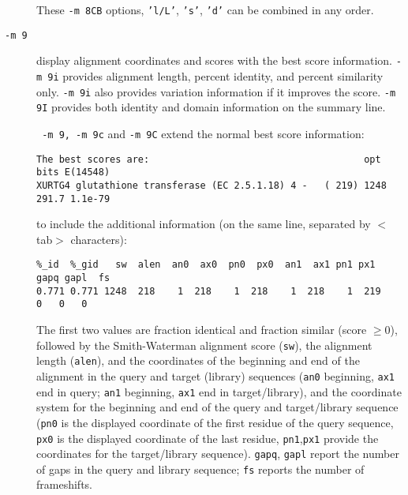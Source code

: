 \documentclass[11pt]{article}
\begin{document}
\begin{description}
  These \texttt{-m 8CB} options, \texttt{'l/L'}, \texttt{'s'}, \texttt{'d'} can be combined in any order.

\item[\texttt{-m 9}] display alignment coordinates and scores with the
  best score information.  \texttt{-m 9i} provides alignment length,
  percent identity, and percent similarity only. \texttt{-m 9i} also
  provides variation information if it improves the score. \texttt{-m
    9I} provides both identity and domain information on the summary
  line.

 \texttt{ -m 9, -m 9c} and \texttt{-m 9C} extend the normal best score information:
\begin{footnotesize}
\begin{verbatim}
The best scores are:                                      opt bits E(14548)
XURTG4 glutathione transferase (EC 2.5.1.18) 4 -   ( 219) 1248 291.7 1.1e-79
\end{verbatim}
\end{footnotesize}

to include the additional information (on the same line, separated by
$<$tab$>$ characters):
\begin{footnotesize}
\begin{verbatim}
%_id  %_gid   sw  alen  an0  ax0  pn0  px0  an1  ax1 pn1 px1 gapq gapl  fs
0.771 0.771 1248  218    1  218    1  218    1  218    1  219   0   0   0
\end{verbatim}
\end{footnotesize}

The first two values are fraction identical and fraction similar
(score $\ge 0$), followed by the Smith-Waterman alignment score (\texttt{sw}), the
alignment length (\texttt{alen}), and the coordinates of the beginning
and end of the alignment in the query and target (library) sequences
(\texttt{an0} beginning, \texttt{ax1} end in query; \texttt{an1}
beginning, \texttt{ax1} end in target/library), and the coordinate
system for the beginning and end of the query and target/library
sequence (\texttt{pn0} is the displayed coordinate of the first
residue of the query sequence, \texttt{px0} is the displayed
coordinate of the last residue, \texttt{pn1},\texttt{px1} provide the
coordinates for the target/library sequence). \texttt{gapq},
\texttt{gapl} report the number of gaps in the query and library
sequence; \texttt{fs} reports the number of frameshifts.


\end{description}
\end{document}
